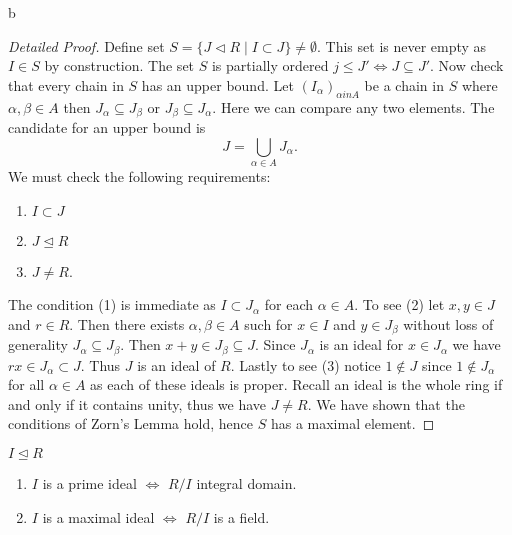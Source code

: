 b\documentclass[master.tex]{subfiles}
\begin{document}
\begin{proof}[Detailed Proof]
  Define set \(S=\{J \lhd R \mid I \subset J\} \neq \emptyset\). This set is never empty as \(I \in S\) by
  construction. The set \(S\) is partially ordered \(j \le J' \iff J \subseteq J'\). Now check that every chain in \(S\)
  has an upper bound. Let \((I_\alpha)_{\alpha in A}\) be a chain in \(S\) where \(\alpha, \beta \in A\) then
  \(J_\alpha \subseteq J_\beta\) or \(J_\beta \subseteq J_\alpha\). Here we can compare any two elements. The candidate
  for an upper bound is
  \[J=\bigcup_{\alpha \in A} J_\alpha.\] We must check the following requirements:
  \begin{enumerate}[label=(\arabic*)]
  \item \(I \subset J\)
  \item \(J \unlhd R\)
  \item \(J \neq R\).
  \end{enumerate}
  The condition (1) is immediate as \(I \subset J_\alpha\) for each \(\alpha \in A\). To see (2) let \(x,y \in J\) and
  \(r \in R\). Then there exists \(\alpha, \beta \in A\) such for \(x \in I\) and \(y \in J_\beta\) without loss of
  generality \(J_\alpha \subseteq J_\beta\). Then \(x+y \in J_\beta \subseteq J\). Since \(J_\alpha\) is an ideal for
  \(x \in J_\alpha\) we have \(rx \in J_\alpha \subset J\). Thus \(J\) is an ideal of \(R\). Lastly to see (3) notice
  \(1 \not \in J\) since \(1 \not \in J_\alpha\) for all \(\alpha \in A\) as each of these ideals is proper. Recall an
  ideal is the whole ring if and only if it contains unity, thus we have \(J \neq R\). We have shown that the conditions
  of Zorn's Lemma hold, hence \(S\) has a maximal element.
\end{proof}

\begin{prop}
  \(I \unlhd R\)
  \begin{enumerate}[label=(\alph*)]
  \item \(I\) is a prime ideal \(\iff\) \(R/I\) integral domain.
  \item \(I\) is a maximal ideal \(\iff\) \(R/I\) is a field.
  \end{enumerate}
\end{prop}
\end{document}
